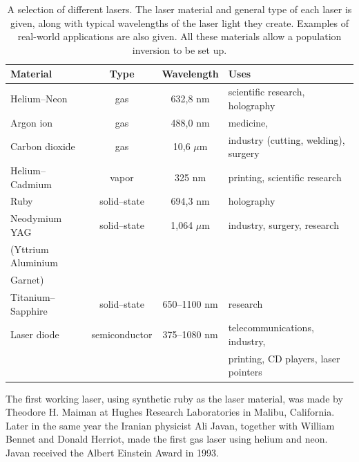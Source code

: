 \begin{table}[H]
\begin{center}
\begin{tabular}{lccl}
\hline
\textbf{Material} & \textbf{Type} & \textbf{Wavelength} & \textbf{Uses} \\
\hline
Helium--Neon & gas & 632,8 nm & scientific research, holography \\
Argon ion & gas & 488,0 nm & medicine, \\
Carbon dioxide & gas & 10,6 $\mu$m & industry (cutting, welding), surgery \\
Helium--Cadmium & vapor & 325 nm & printing, scientific research \\
Ruby & solid--state & 694,3 nm & holography \\
Neodymium YAG & solid--state & 1,064 $\mu$m & industry, surgery, research \\
(Yttrium Aluminium \\
Garnet) \\
Titanium--Sapphire & solid--state & 650--1100 nm & research \\
Laser diode & semiconductor & 375--1080 nm & telecommunications, industry, \\
& & & printing, CD players, laser pointers \\
\hline
\end{tabular}
\end{center}
\caption{A selection of different lasers. The laser material and general type of each laser is given, along with typical wavelengths of the laser light they create. Examples of real-world applications are also given. All these materials allow a population inversion to be set up.}
\label{lasertypes}
\end{table}


\begin{IFact}
{The first working laser, using synthetic ruby as the laser material, was made by Theodore H. Maiman at Hughes Research Laboratories in Malibu, California. Later in the same year the Iranian physicist Ali Javan, together with William Bennet and Donald Herriot, made the first gas laser using helium and neon. Javan received the Albert Einstein Award in 1993.}
\end{IFact}


